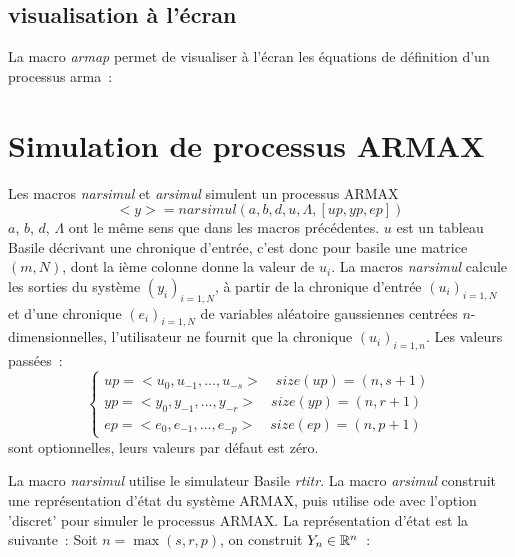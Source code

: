 \subsection{visualisation \`a l'\'ecran}
La macro {\em armap} permet de visualiser \`a l'\'ecran les \'equations de d\'efinition d'un processus arma~:


\section{Simulation de processus ARMAX}

Les macros {\em narsimul} et {\em arsimul} simulent un processus ARMAX
\begin{equation}
	<y>=narsimul(a,b,d,u,\Lambda,[up,yp,ep])
\end{equation}
 $a$, $b$, $d$, $\Lambda$ ont le m\^eme sens que dans les macros pr\'ec\'edentes. $u$ est un tableau Basile d\'ecrivant une chronique d'entr\'ee, c'est donc pour basile une matrice $(m,N)$, dont la i\`eme colonne donne la valeur de $u_{i}$. La macros {\em narsimul}
 calcule les sorties du syst\`eme $(y_{i})_{i=1,N}$, \`a partir de la chronique d'entr\'ee $(u_{i})_{i=1,N}$ et d'une chronique $(e_{i})_{i=1,N}$ de variables al\'eatoire 
 gaussiennes centr\'ees $n$-dimensionnelles, l'utilisateur ne fournit que la chronique $(u_{i})_{{i=1,n}}$. Les valeurs pass\'ees~:
\begin{equation}
\left\{ \begin{array}{l}
      up=< u_0,u_{-1},...,u_{-{s}}> \quad size(up)=(n,s+1)\\ 
      yp=< y_0,y_{-1},...,y_{-r}> \quad size(yp)=(n,r+1)\\ 
      ep=< e_0,e_{-1},...,e_{-p}> \quad size(ep)=(n,p+1) 
	\end{array}\right.
\end{equation}
 sont optionnelles, leurs valeurs par d\'efaut est z\'ero.

La macro {\em narsimul} utilise le simulateur Basile {\em rtitr}. 
La macro {\em arsimul} construit une repr\'esentation d'\'etat 
 du syst\`eme ARMAX, puis utilise ode avec l'option 'discret' pour simuler
le processus ARMAX. La repr\'esentation d'\'etat est la suivante~:
Soit $n=\max(s,r,p)$, on construit $Y_{n}\in {\Bbb R}^n$~:
\def\avect#1{ \begin{array}{c} #1_{1}\\	\vdots \\ #1_{n} \\ \end{array} }

